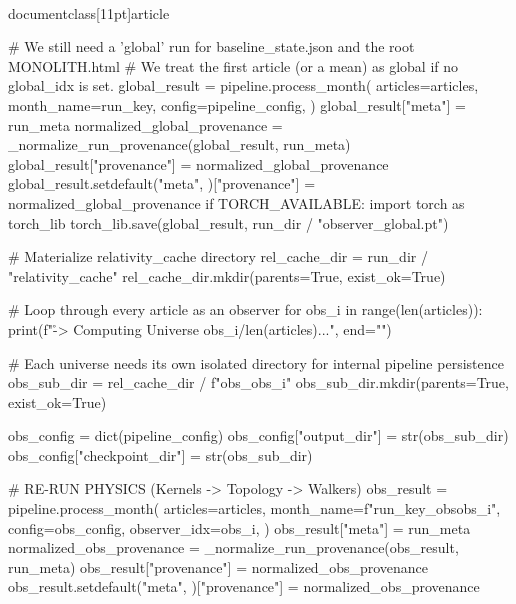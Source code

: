 \\documentclass[11pt]{article}
\begin{document}
\begin{CodeBlock}
                # We still need a 'global' run for baseline_state.json and the root MONOLITH.html
                # We treat the first article (or a mean) as global if no global_idx is set.
                global_result = pipeline.process_month(
                    articles=articles,
                    month_name=run_key,
                    config=pipeline_config,
                )
                global_result["meta"] = run_meta
                normalized_global_provenance = _normalize_run_provenance(global_result, run_meta)
                global_result["provenance"] = normalized_global_provenance
                global_result.setdefault("meta", {})["provenance"] = normalized_global_provenance
                if TORCH_AVAILABLE:
                    import torch as torch_lib
                    torch_lib.save(global_result, run_dir / "observer_global.pt")
                 
                # Materialize relativity_cache directory
                rel_cache_dir = run_dir / "relativity_cache"
                rel_cache_dir.mkdir(parents=True, exist_ok=True)
                
                # Loop through every article as an observer
                for obs_i in range(len(articles)):
                    print(f"\r      -> Computing Universe {obs_i}/{len(articles)}...", end="")
                    
                    # Each universe needs its own isolated directory for internal pipeline persistence
                    obs_sub_dir = rel_cache_dir / f"obs_{obs_i}"
                    obs_sub_dir.mkdir(parents=True, exist_ok=True)
                    
                    obs_config = dict(pipeline_config)
                    obs_config["output_dir"] = str(obs_sub_dir)
                    obs_config["checkpoint_dir"] = str(obs_sub_dir)

                    # RE-RUN PHYSICS (Kernels -> Topology -> Walkers)
                    obs_result = pipeline.process_month(
                        articles=articles,
                        month_name=f"{run_key}_obs{obs_i}",
                        config=obs_config,
                        observer_idx=obs_i,
                    )
                    obs_result["meta"] = run_meta
                    normalized_obs_provenance = _normalize_run_provenance(obs_result, run_meta)
                    obs_result["provenance"] = normalized_obs_provenance
                    obs_result.setdefault("meta", {})["provenance"] = normalized_obs_provenance
                    

\end{CodeBlock}
\end{document}
